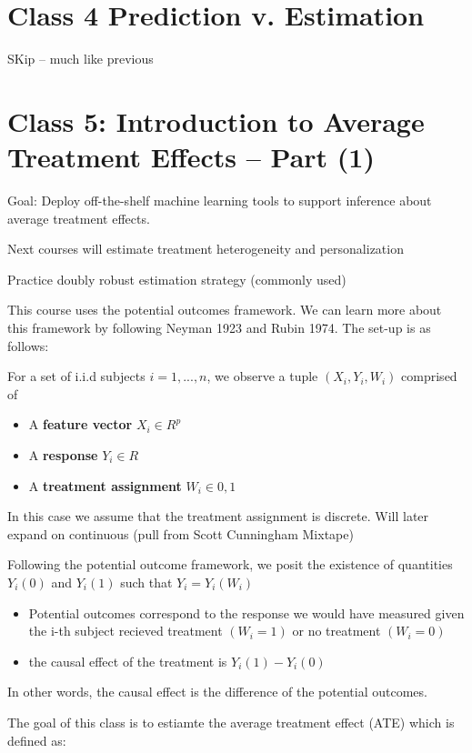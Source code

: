 \documentclass{article}
\begin{document}
\section{Class 4 Prediction v. Estimation}

SKip -- much like previous

\section{Class 5: Introduction to Average Treatment Effects -- Part (1)}

Goal: Deploy off-the-shelf machine learning tools to support inference about average treatment effects.

Next courses will estimate treatment heterogeneity and personalization

Practice doubly robust estimation strategy (commonly used)

This course uses the potential outcomes framework. We can learn more about this framework by following Neyman 1923 and Rubin 1974. The set-up is as follows:

For a set of i.i.d subjects $i = 1,...,n$, we observe a tuple $(X_i, Y_i,W_i)$ comprised of 
\begin{itemize}
    \item A \textbf{feature vector} $X_i \in R^p$
    \item A \textbf{response} $Y_i \in R$
    \item A \textbf{treatment assignment} $W_i \in {0,1}$
\end{itemize}

In this case we assume that the treatment assignment is discrete. Will later expand on continuous (pull from Scott Cunningham Mixtape)

Following the potential outcome framework, we posit the existence of quantities $Y_i(0)$ and $Y_i(1)$ such that $Y_i = Y_i (W_i)$
\begin{itemize}
    \item Potential outcomes correspond to the response we would have measured given the i-th subject recieved treatment $(W_i =1)$ or no treatment $(W_i = 0)$
    \item the causal effect of the treatment is $Y_i(1) - Y_i(0)$
\end{itemize}

In other words, the causal effect is the difference of the potential outcomes.

The goal of this class is to estiamte the average treatment effect (ATE) which is defined as:
\end{document}
